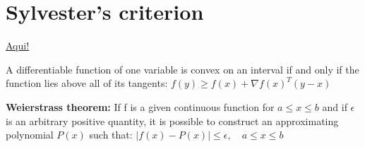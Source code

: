 \section{Sylvester's criterion}
\href{https://en.wikipedia.org/wiki/Sylvester\%27s_criterion}{Aqui!}

A differentiable function of one variable is convex on an interval if and only if the function lies above all of its tangents:
$f(y)\geq f(x)+\nabla f(x)^T(y-x)$

\textbf{Weierstrass theorem:} If f is a given  continuous  function for $a\leq x \leq b$ and if $\epsilon$ is an arbitrary positive quantity, it is possible to construct an approximating polynomial $P(x)$ such that: $|f(x)-P(x)|\leq \epsilon, \quad a\leq x\leq b$